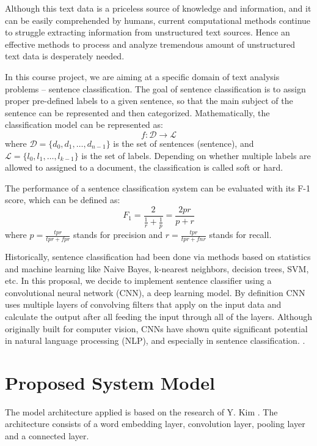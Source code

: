\documentclass[conference]{IEEEtran}
\begin{document}
    Although this text data is a priceless source of knowledge and information,
    and it can be easily comprehended by humans, current computational methods
    continue to struggle extracting information from unstructured text sources\cite{mitchell2015}.
    Hence an effective methods to process and analyze tremendous
    amount of unstructured text data is desperately needed.
    
    In this course project, we are aiming at a specific domain of text analysis
    problems -- sentence classification. The goal of sentence classification is to assign
    proper pre-defined labels to a given sentence, so that the main subject of the 
    sentence can be represented and then categorized\cite{allahyari2017brief}. 
    Mathematically, the classification model can be represented as:
    $$f:\mathcal{D}\rightarrow\mathcal{L}$$
    where $\mathcal{D}=\{d_0, d_1,\ldots, d_{n-1}\}$ is the set of sentences
    (sentence), and $\mathcal{L}=\{l_0, l_1,\ldots, l_{k-1}\}$ is the set of labels.
    Depending on whether multiple labels are allowed to assigned to a document, the 
    classification is called soft or hard\cite{gopal2010multilabel}.
    
    The performance of a sentence classification system can be evaluated with its
    F-1 score, which can be defined as\cite{forman2003extensive}:
    $$F_1=\frac{2}{\frac{1}{r}+\frac{1}{p}}=\frac{2pr}{p+r}$$
    where $p=\frac{tpr}{tpr+fpr}$ stands for precision and $r=\frac{tpr}{tpr+fnr}$ 
    stands for recall.
    
    Historically, sentence classification had been done via methods based on 
    statistics and machine learning like Naive Bayes, k-nearest neighbors, decision 
    trees, SVM, etc. In this proposal, we decide to implement sentence classifier
    using a convolutional neural network (CNN), a deep learning model. By definition
    CNN uses multiple layers of convolving filters that apply on the input data and 
    calculate the output after all feeding the input through all of the layers. Although
    originally built for computer vision, CNNs have shown quite significant potential in 
    natural language processing (NLP), and especially in sentence classification.
    \cite{kim2014convolutional}. 

\section{Proposed System Model}
The model architecture applied is based on the research of Y. Kim \cite{kim2014convolutional}. The architecture 
consists of a word embedding layer, convolution layer, pooling layer and a connected
layer. 
\end{document}
